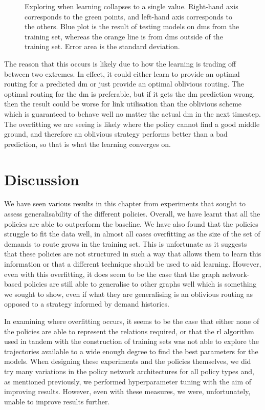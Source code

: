 \begin{figure}
    \centering
    
    \caption{Exploring when learning collapses to a single value. Right-hand axis corresponds to the green points, and left-hand axis corresponds to the others. Blue plot is the result of testing models on \acp{dm} from the training set, whereas the orange line is from \acp{dm} outside of the training set. Error area is the standard deviation.}
    \label{fig:exp_fail}
\end{figure}

The reason that this occurs is likely due to how the learning is trading off between two extremes. In effect, it could either learn to provide an optimal routing for a predicted \ac{dm} or just provide an optimal oblivious routing. The optimal routing for the \ac{dm} is preferable, but if it gets the \ac{dm} prediction wrong, then the result could be worse for link utilisation than the oblivious scheme which is guaranteed to behave well no matter the actual \ac{dm} in the next timestep. The overfitting we are seeing is likely where the policy cannot find a good middle ground, and therefore an oblivious strategy performs better than a bad prediction, so that is what the learning converges on.


\section{Discussion}
We have seen various results in this chapter from experiments that sought to assess generalisability of the different policies. Overall, we have learnt that all the policies are able to outperform the baseline. We have also found that the policies struggle to fit the data well, in almost all cases overfitting as the size of the set of demands to route grows in the training set. This is unfortunate as it suggests that these policies are not structured in such a way that allows them to learn this information or that a different technique should be used to aid learning. However, even with this overfitting, it does seem to be the case that the graph network-based policies are still able to generalise to other graphs well which is something we sought to show, even if what they are generalising is an oblivious routing as opposed to a strategy informed by demand histories.

In examining where overfitting occurs, it seems to be the case that either none of the policies are able to represent the relations required, or that the \ac{rl} algorithm used in tandem with the construction of training sets was not able to explore the trajectories available to a wide enough degree to find the best parameters for the models. When designing these experiments and the policies themselves, we did try many variations in the policy network architectures for all policy types and, as mentioned previously, we performed hyperparameter tuning with the aim of improving results. However, even with these measures, we were, unfortunately, unable to improve results further.

